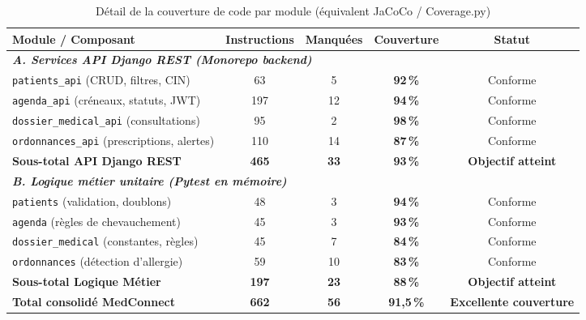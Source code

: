 \documentclass[12pt,a4paper]{report}
\begin{document}
\begin{table}[H]
\centering
\caption{Détail de la couverture de code par module (équivalent JaCoCo / Coverage.py)}
\renewcommand{\arraystretch}{1.3}
\begin{tabular}{|p{5.5cm}|c|c|c|c|}
  \hline
  \rowcolor{medaccent}
  \textbf{Module / Composant} & \textbf{Instructions} & \textbf{Manquées} & \textbf{Couverture} & \textbf{Statut} \\
  \hline
  \multicolumn{5}{|l|}{\textit{\textbf{A. Services API Django REST (Monorepo backend)}}} \\
  \hline
  \texttt{patients\_api} (CRUD, filtres, CIN) & 63 & 5 & \textcolor{medgreen}{\textbf{92\,\%}} & Conforme \\
  \hline
  \texttt{agenda\_api} (créneaux, statuts, JWT) & 197 & 12 & \textcolor{medgreen}{\textbf{94\,\%}} & Conforme \\
  \hline
  \texttt{dossier\_medical\_api} (consultations) & 95 & 2 & \textcolor{medgreen}{\textbf{98\,\%}} & Conforme \\
  \hline
  \texttt{ordonnances\_api} (prescriptions, alertes) & 110 & 14 & \textcolor{medgreen}{\textbf{87\,\%}} & Conforme \\
  \hline
  \rowcolor{medaccent!50}
  \textbf{Sous-total API Django REST} & \textbf{465} & \textbf{33} & \textcolor{medgreen}{\textbf{93\,\%}} & \textbf{Objectif atteint} \\
  \hline
  \multicolumn{5}{|l|}{\textit{\textbf{B. Logique métier unitaire (Pytest en mémoire)}}} \\
  \hline
  \texttt{patients} (validation, doublons) & 48 & 3 & \textcolor{medgreen}{\textbf{94\,\%}} & Conforme \\
  \hline
  \texttt{agenda} (règles de chevauchement) & 45 & 3 & \textcolor{medgreen}{\textbf{93\,\%}} & Conforme \\
  \hline
  \texttt{dossier\_medical} (constantes, règles) & 45 & 7 & \textcolor{medgreen}{\textbf{84\,\%}} & Conforme \\
  \hline
  \texttt{ordonnances} (détection d'allergie) & 59 & 10 & \textcolor{medgreen}{\textbf{83\,\%}} & Conforme \\
  \hline
  \rowcolor{medaccent!50}
  \textbf{Sous-total Logique Métier} & \textbf{197} & \textbf{23} & \textcolor{medgreen}{\textbf{88\,\%}} & \textbf{Objectif atteint} \\
  \hline
  \rowcolor{medgreen!20}
  \textbf{Total consolidé MedConnect} & \textbf{662} & \textbf{56} & \textcolor{medgreen}{\textbf{91,5\,\%}} & \textbf{Excellente couverture} \\
  \hline
\end{tabular}
\end{table}
\end{document}
